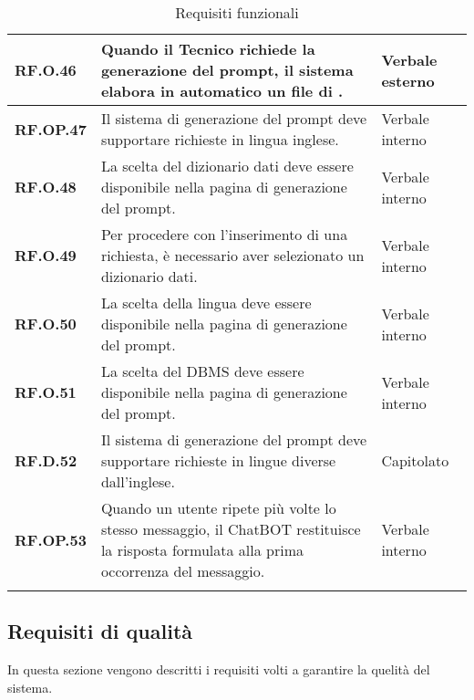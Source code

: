 \begin{longtable}{|P{3cm}|P{6,5cm}|>{\arraybackslash}P{4cm}|}
    \hline
    \textbf{RF.O.46} & Quando il Tecnico richiede la generazione del prompt, il sistema elabora in automatico un file di . & Verbale esterno \\
    \hline
    \textbf{RF.OP.47} & Il sistema di generazione del prompt deve supportare richieste in lingua inglese. & Verbale interno \\
    \hline
    \textbf{RF.O.48} & La scelta del dizionario dati deve essere disponibile nella pagina di generazione del prompt. & Verbale interno \\
    \hline
    \textbf{RF.O.49} & Per procedere con l'inserimento di una richiesta, è necessario aver selezionato un dizionario dati. & Verbale interno \\
    \hline
    \textbf{RF.O.50} & La scelta della lingua deve essere disponibile nella pagina di generazione del prompt. & Verbale interno \\
    \hline
    \textbf{RF.O.51} & La scelta del DBMS deve essere disponibile nella pagina di generazione del prompt. & Verbale interno \\
    \hline
    \textbf{RF.D.52} & Il sistema di generazione del prompt deve supportare richieste in lingue diverse dall'inglese. & Capitolato \\
    \hline
    \textbf{RF.OP.53} & Quando un utente ripete più volte lo stesso messaggio, il ChatBOT restituisce la risposta formulata alla prima occorrenza del messaggio. & Verbale interno \\
    \hline
\caption{Requisiti funzionali}
\label{requisitifunzionali}
\end{longtable}

\subsection{Requisiti di qualità}
In questa sezione vengono descritti i requisiti volti a garantire la quelità del sistema.

